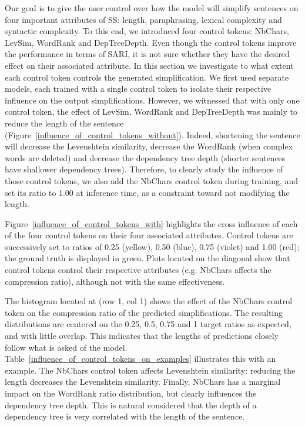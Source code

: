 \documentclass[10pt, a4paper]{article}
\begin{document}
\begin{table*}
{\begin{tabular}{ll}
    \end{tabular}}
    \caption{Influence of control tokens on example sentences. Each source sentence is simplified with models trained with each of the four control tokens with varying target ratios; modified words are in bold. The NbChars constraint is added for LevSim, WordRank and DepTreeDepth.
    \label{influence_of_control_tokens_on_examples}}
\end{table*}


Our goal is to give the user control over how the model will simplify sentences on four important attributes of SS: length, paraphrasing, lexical complexity and syntactic complexity.
To this end, we introduced four control tokens: NbChars, LevSim, WordRank and DepTreeDepth.
Even though the control tokens improve the performance in terms of SARI, it is not sure whether they have the desired effect on their associated attribute.
In this section we investigate to what extent each control token controls the generated simplification.
We first used separate models, each trained with a single control token to isolate their respective influence on the output simplifications.
However, we witnessed that with only one control token, the effect of LevSim, WordRank and DepTreeDepth was mainly to reduce the length of the sentence (Figure~\ref{influence_of_control_tokens_without}). Indeed, shortening the sentence will decrease the Levenshtein similarity, decrease the WordRank (when complex words are deleted) and decrease the dependency tree depth (shorter sentences have shallower dependency trees).
Therefore, to clearly study the influence of those control tokens, we also add the NbChars control token during training, and set its ratio to 1.00 at inference time, as a constraint toward not modifying the length.

Figure~\ref{influence_of_control_tokens_with} highlights the cross influence of each of the four control tokens on their four associated attributes. Control tokens are successively set to ratios of 0.25 (yellow), 0.50 (blue), 0.75 (violet) and 1.00 (red); the ground truth is displayed in green.
Plots located on the diagonal show that control tokens control their respective attributes (e.g. NbChars affects the compression ratio), although not with the same effectiveness.

The histogram located at (row 1, col 1) shows the effect of the NbChars control token on the compression ratio of the predicted simplifications.
The resulting distributions are centered on the 0.25, 0.5, 0.75 and 1 target ratios as expected, and with little overlap.
This indicates that the lengths of predictions closely follow what is asked of the model. Table~\ref{influence_of_control_tokens_on_examples} illustrates this with an example.
The NbChars control token affects Levenshtein similarity: reducing the length decreases the Levenshtein similarity.
Finally, NbChars has a marginal impact on the WordRank ratio distribution, but clearly influences the dependency tree depth. This is natural considered that the depth of a dependency tree is very correlated with the length of the sentence.
\end{document}
